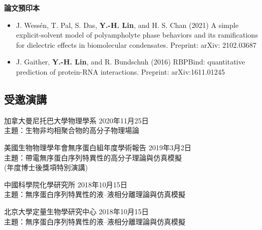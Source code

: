 \documentclass[11pt,letterpaper, sans]{article}
\newcommand{\tname}[1]{{\bf #1}}%
\newcommand{\newsec}[1]{\subsection*{\hspace{-1.5pt}\Large\uppercase{\bf #1}}}
\begin{document}
\begin{flushleft}






{\bf\large 論文預印本}

\begin{itemize}[leftmargin=*, itemsep=0in]

\item 
J. Wessén, T. Pal,  S. Das, \tname{Y.-H. Lin}, and H. S. Chan (2021)
A simple explicit-solvent model of polyampholyte phase behaviors and its ramifications for dielectric effects in biomolecular condensates.
Preprint: arXiv: 2102.03687 

\item 
J. Gaither, \tname{Y.-H. Lin}, and R. Bundschuh (2016) 
RBPBind: quantitative prediction of protein-RNA interactions. 
Preprint: arXiv:1611.01245 %

\end{itemize} 


\newsec{受邀演講}

\begin{etaremune}[leftmargin=17pt]

\item 加拿大曼尼托巴大學物理學系 \hfill 2020年11月25日 \\
主題：生物非均相聚合物的高分子物理場論

\item 美國生物物理學年會無序蛋白組年度學術報告 \hfill 2019年3月2日 \\
主題：帶電無序蛋白序列特異性的高分子理論與仿真模擬 \\
(年度博士後獎項特別演講)

\item 中國科學院化學研究所 \hfill 2018年10月15日 \\
主題：無序蛋白序列特異性的液--液相分離理論與仿真模擬

\item 北京大學定量生物學研究中心 \hfill 2018年10月15日 \\
主題：無序蛋白序列特異性的液--液相分離理論與仿真模擬


\end{etaremune}
\end{flushleft}
\end{document}
